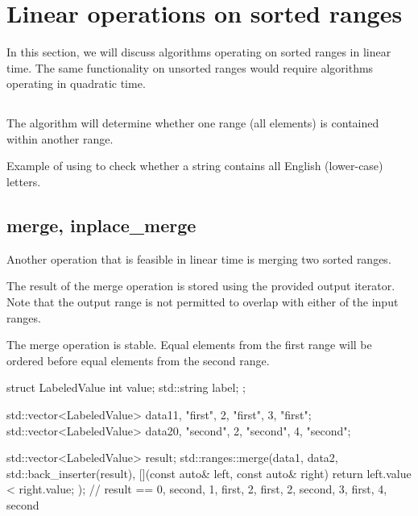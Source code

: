 \section{Linear operations on sorted ranges}

In this section, we will discuss algorithms operating on sorted ranges in linear time. The same functionality on unsorted ranges would require algorithms operating in quadratic time.

\subsection{\texorpdfstring{}{\texttt{std::includes}}}

The  algorithm will determine whether one range (all elements) is contained within another range.


\begin{box-note}
\footnotesize Example of using  to check whether a string contains all English (lower-case) letters.
\tcblower
{}
\end{box-note}

\subsection{merge, inplace\_merge}

Another operation that is feasible in linear time is merging two sorted ranges.



The result of the merge operation is stored using the provided output iterator. Note that the output range is not permitted to overlap with either of the input ranges.

The merge operation is stable. Equal elements from the first range will be ordered before equal elements from the second range.

\begin{box-note}
\begin{cppcode}
struct LabeledValue {
    int value;
    std::string label;
};

std::vector<LabeledValue> data1{{1, "first"}, {2, "first"}, {3, "first"}};
std::vector<LabeledValue> data2{{0, "second"}, {2, "second"}, {4, "second"}};

std::vector<LabeledValue> result;
std::ranges::merge(data1, data2, std::back_inserter(result),
  [](const auto& left, const auto& right) { return left.value < right.value; });
// result == {0, second}, {1, first}, {2, first}, {2, second}, {3, first}, {4, second}
\end{cppcode}
\end{box-note}

